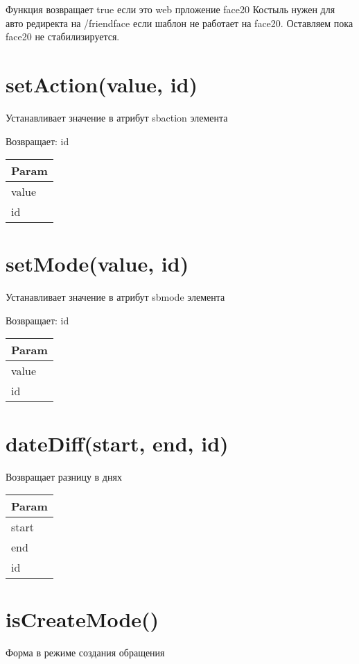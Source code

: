 Функция возвращает true если это web прложение face20 Костыль нужен для
авто редиректа на /friendface если шаблон не работает на face20.
Оставляем пока face20 не стабилизируется.


\hypertarget{setactionvalue-id}{%
\section{setAction(value, id)}\label{setactionvalue-id}}

Устанавливает значение в атрибут sbaction элемента

Возвращает: id

\begin{longtable}[]{@{}l@{}}
\toprule
Param\tabularnewline
\midrule
\endhead
value\tabularnewline
id\tabularnewline
\bottomrule
\end{longtable}

\hypertarget{setmodevalue-id}{%
\section{setMode(value, id)}\label{setmodevalue-id}}

Устанавливает значение в атрибут sbmode элемента

Возвращает: id

\begin{longtable}[]{@{}l@{}}
\toprule
Param\tabularnewline
\midrule
\endhead
value\tabularnewline
id\tabularnewline
\bottomrule
\end{longtable}

\hypertarget{datediffstart-end-id}{%
\section{dateDiff(start, end, id)}\label{datediffstart-end-id}}

Возвращает разницу в днях


\begin{longtable}[]{@{}l@{}}
\toprule
Param\tabularnewline
\midrule
\endhead
start\tabularnewline
end\tabularnewline
id\tabularnewline
\bottomrule
\end{longtable}

\hypertarget{iscreatemode-boolean}{%
\section{isCreateMode()}\label{iscreatemode-boolean}}

Форма в режиме создания обращения


